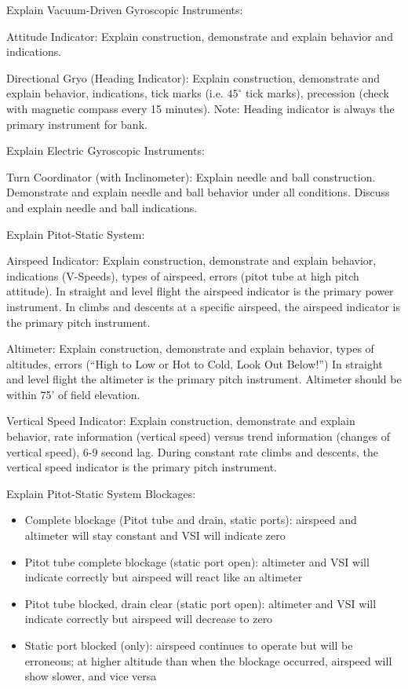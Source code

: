 Explain Vacuum-Driven Gyroscopic Instruments:

Attitude Indicator: Explain construction, demonstrate and explain behavior and
indications.

Directional Gryo (Heading Indicator): Explain construction, demonstrate and
explain behavior, indications, tick marks (i.e. $45^{\circ}$ tick marks),
precession (check with magnetic compass every 15 minutes). Note: Heading
indicator is always the primary instrument for bank.

Explain Electric Gyroscopic Instruments:

Turn Coordinator (with Inclinometer): Explain needle and ball construction.
Demonstrate and explain needle and ball behavior under all conditions. Discuss
and explain needle and ball indications.

Explain Pitot-Static System:

Airspeed Indicator: Explain construction, demonstrate and explain behavior,
indications (V-Speeds), types of airspeed, errors (pitot tube at high pitch
attitude). In straight and level flight the airspeed indicator is the primary
power instrument. In climbs and descents at a specific airspeed, the airspeed
indicator is the primary pitch instrument.

Altimeter: Explain construction, demonstrate and explain behavior, types of
altitudes, errors (``High to Low or Hot to Cold, Look Out Below!'') In straight
and level flight the altimeter is the primary pitch instrument. Altimeter
should be within 75' of field elevation.

Vertical Speed Indicator: Explain construction, demonstrate and explain
behavior, rate information (vertical speed) versus trend information (changes
of vertical speed), 6-9 second lag. During constant rate climbs and descents,
the vertical speed indicator is the primary pitch instrument.

Explain Pitot-Static System Blockages:
\begin{itemize}
  \item Complete blockage (Pitot tube and drain, static ports): airspeed and
    altimeter will stay constant and VSI will indicate zero

  \item Pitot tube complete blockage (static port open): altimeter and VSI will
    indicate correctly but airspeed will react like an altimeter

  \item Pitot tube blocked, drain clear (static port open): altimeter and VSI
    will indicate correctly but airspeed will decrease to zero

  \item Static port blocked (only): airspeed continues to operate but will be
    erroneous; at higher altitude than when the blockage occurred, airspeed
    will show slower, and vice versa
\end{itemize}

